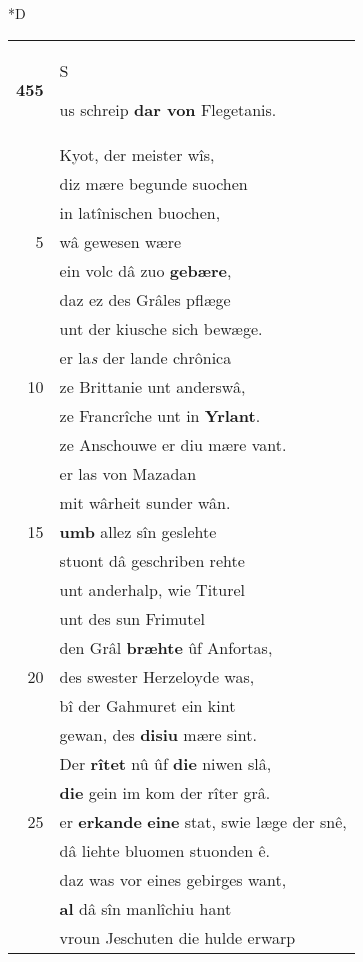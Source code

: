 \documentclass[8pt,a4paper,notitlepage]{article}
\begin{document}
\begin{table}[ht]
\begin{minipage}[t]{0.5\linewidth}
\small
\begin{center}*D
\end{center}
\begin{tabular}{rl}
\textbf{455} & \begin{large}S\end{large}us schreip \textbf{dar von} Flegetanis.\\ 
 & Kyot, der meister wîs,\\ 
 & diz mære begunde suochen\\ 
 & in latînischen buochen,\\ 
5 & wâ gewesen wære\\ 
 & ein volc dâ zuo \textbf{gebære},\\ 
 & daz ez des Grâles pflæge\\ 
 & unt der kiusche sich bewæge.\\ 
 & er la\textit{s} der lande chrônica\\ 
10 & ze Brittanie unt anderswâ,\\ 
 & ze Francrîche unt in \textbf{Yrlant}.\\ 
 & ze Anschouwe er diu mære vant.\\ 
 & er las von Mazadan\\ 
 & mit wârheit sunder wân.\\ 
15 & \textbf{umb} allez sîn geslehte\\ 
 & stuont dâ geschriben rehte\\ 
 & unt anderhalp, wie Titurel\\ 
 & unt des sun Frimutel\\ 
 & den Grâl \textbf{bræhte} ûf Anfortas,\\ 
20 & des swester Herzeloyde  was,\\ 
 & bî der Gahmuret ein kint\\ 
 & gewan, des \textbf{disiu} mære sint.\\ 
 & Der \textbf{rîtet} nû ûf \textbf{die} niwen slâ,\\ 
 & \textbf{die} gein im kom der rîter grâ.\\ 
25 & er \textbf{erkande} \textbf{eine} stat, swie læge der snê,\\ 
 & dâ liehte bluomen stuonden ê.\\ 
 & daz was vor eines gebirges want,\\ 
 & \textbf{al} dâ sîn manlîchiu hant\\ 
 & vroun Jeschuten die hulde erwarp\\ 

\end{tabular}
\end{minipage}
\end{table}
\end{document}
